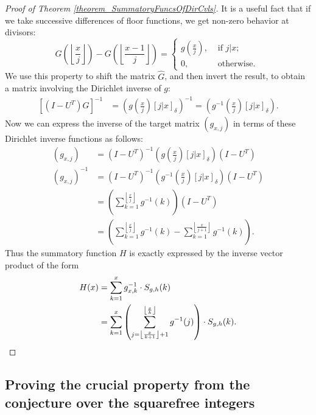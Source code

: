 \documentclass[11pt,reqno,a4letter]{article}
\numberwithin{figure}{section}
\numberwithin{table}{section}
\newcommand{\Iverson}[1]{\ensuremath{\left[#1\right]_{\delta}}}
\newcommand{\floor}[1]{\left\lfloor #1 \right\rfloor}
\theoremstyle{plain}
\numberwithin{theorem}{section}
\theoremstyle{definition}
\begin{document}
\begin{proof}[Proof of Theorem \ref{theorem_SummatoryFuncsOfDirCvls}]
It is a useful fact that if we take successive differences of floor functions, we get non-zero behavior at divisors: 
\[
G\left(\floor{\frac{x}{j}}\right) - G\left(\floor{\frac{x-1}{j}}\right) = 
     \begin{cases} 
     g\left(\frac{x}{j}\right), & \text{ if $j | x$; } \\ 
     0, & \text{ otherwise. } 
     \end{cases}
\]
We use this property to shift the matrix $\hat{G}$, and then invert the result, to obtain a matrix involving the 
Dirichlet inverse of $g$: 
\begin{align*} 
\left[(I-U^{T}) \hat{G}\right]^{-1} & = \left(g\left(\frac{x}{j}\right) \Iverson{j|x}\right)^{-1} = 
     \left(g^{-1}\left(\frac{x}{j}\right) \Iverson{j|x}\right). 
\end{align*} 
Now we can express the inverse of the target matrix $(g_{x,j})$ in terms of these Dirichlet inverse functions 
as follows: 
\begin{align*} 
(g_{x,j}) & = (I-U^{T})^{-1} \left(g\left(\frac{x}{j}\right) \Iverson{j|x}\right) (I-U^{T}) \\ 
(g_{x,j})^{-1} & = (I-U^{T})^{-1} \left(g^{-1}\left(\frac{x}{j}\right) \Iverson{j|x}\right) (I-U^{T}) \\ 
     & = \left(\sum_{k=1}^{\floor{\frac{x}{j}}} g^{-1}(k)\right) (I-U^{T}) \\ 
     & = \left(\sum_{k=1}^{\floor{\frac{x}{j}}} g^{-1}(k) - \sum_{k=1}^{\floor{\frac{x}{j+1}}} g^{-1}(k)\right). 
\end{align*} 
Thus the summatory function $H$ is exactly expressed by the inverse vector product of the form 
\begin{align*} 
H(x) & = \sum_{k=1}^x g_{x,k}^{-1} \cdot S_{g,h}(k) \\ 
     & = \sum_{k=1}^x \left(\sum_{j=\floor{\frac{x}{k+1}}+1}^{\floor{\frac{x}{k}}} g^{-1}(j)\right) \cdot S_{g,h}(k). 
     \qedhere
\end{align*} 
\end{proof} 

\subsection{Proving the crucial property from the conjecture over the squarefree integers} 
\end{document}
